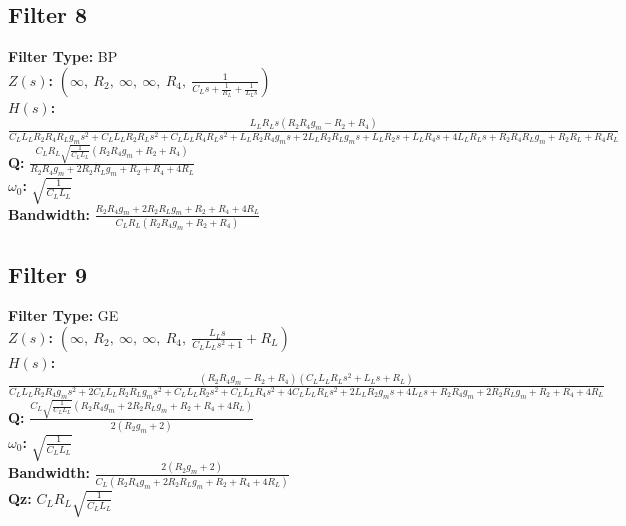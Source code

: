 \documentclass{article}
\begin{document}
\subsection*{Filter 8}
\textbf{Filter Type:} BP \\ 
\textbf{$Z(s)$:} $\left( \infty, \  R_{2}, \  \infty, \  \infty, \  R_{4}, \  \frac{1}{C_{L} s + \frac{1}{R_{L}} + \frac{1}{L_{L} s}}\right)$ \\ 
\textbf{$H(s)$:} $\frac{L_{L} R_{L} s \left(R_{2} R_{4} g_{m} - R_{2} + R_{4}\right)}{C_{L} L_{L} R_{2} R_{4} R_{L} g_{m} s^{2} + C_{L} L_{L} R_{2} R_{L} s^{2} + C_{L} L_{L} R_{4} R_{L} s^{2} + L_{L} R_{2} R_{4} g_{m} s + 2 L_{L} R_{2} R_{L} g_{m} s + L_{L} R_{2} s + L_{L} R_{4} s + 4 L_{L} R_{L} s + R_{2} R_{4} R_{L} g_{m} + R_{2} R_{L} + R_{4} R_{L}}$ \\ 
\textbf{Q:} $\frac{C_{L} R_{L} \sqrt{\frac{1}{C_{L} L_{L}}} \left(R_{2} R_{4} g_{m} + R_{2} + R_{4}\right)}{R_{2} R_{4} g_{m} + 2 R_{2} R_{L} g_{m} + R_{2} + R_{4} + 4 R_{L}}$ \\ 
\textbf{$\omega_0$:} $\sqrt{\frac{1}{C_{L} L_{L}}}$ \\ 
\textbf{Bandwidth:} $\frac{R_{2} R_{4} g_{m} + 2 R_{2} R_{L} g_{m} + R_{2} + R_{4} + 4 R_{L}}{C_{L} R_{L} \left(R_{2} R_{4} g_{m} + R_{2} + R_{4}\right)}$ \\ 
\subsection*{Filter 9}
\textbf{Filter Type:} GE \\ 
\textbf{$Z(s)$:} $\left( \infty, \  R_{2}, \  \infty, \  \infty, \  R_{4}, \  \frac{L_{L} s}{C_{L} L_{L} s^{2} + 1} + R_{L}\right)$ \\ 
\textbf{$H(s)$:} $\frac{\left(R_{2} R_{4} g_{m} - R_{2} + R_{4}\right) \left(C_{L} L_{L} R_{L} s^{2} + L_{L} s + R_{L}\right)}{C_{L} L_{L} R_{2} R_{4} g_{m} s^{2} + 2 C_{L} L_{L} R_{2} R_{L} g_{m} s^{2} + C_{L} L_{L} R_{2} s^{2} + C_{L} L_{L} R_{4} s^{2} + 4 C_{L} L_{L} R_{L} s^{2} + 2 L_{L} R_{2} g_{m} s + 4 L_{L} s + R_{2} R_{4} g_{m} + 2 R_{2} R_{L} g_{m} + R_{2} + R_{4} + 4 R_{L}}$ \\ 
\textbf{Q:} $\frac{C_{L} \sqrt{\frac{1}{C_{L} L_{L}}} \left(R_{2} R_{4} g_{m} + 2 R_{2} R_{L} g_{m} + R_{2} + R_{4} + 4 R_{L}\right)}{2 \left(R_{2} g_{m} + 2\right)}$ \\ 
\textbf{$\omega_0$:} $\sqrt{\frac{1}{C_{L} L_{L}}}$ \\ 
\textbf{Bandwidth:} $\frac{2 \left(R_{2} g_{m} + 2\right)}{C_{L} \left(R_{2} R_{4} g_{m} + 2 R_{2} R_{L} g_{m} + R_{2} + R_{4} + 4 R_{L}\right)}$ \\ 
\textbf{Qz:} $C_{L} R_{L} \sqrt{\frac{1}{C_{L} L_{L}}}$ \\ 
\end{document}
